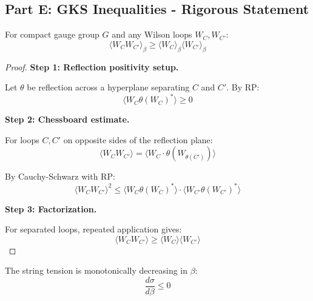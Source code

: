 \subsection{Part E: GKS Inequalities - Rigorous Statement}

\begin{theorem}
\label{thm:gks-gauge}
For compact gauge group $G$ and any Wilson loops $W_C, W_{C'}$:
\begin{equation}
\langle W_C W_{C'} \rangle_\beta \geq \langle W_C \rangle_\beta \langle W_{C'} \rangle_\beta
\end{equation}
\end{theorem}

\begin{proof}
\textbf{Step 1: Reflection positivity setup.}

Let $\theta$ be reflection across a hyperplane separating $C$ and $C'$.
By RP:
\begin{equation}
\langle W_C \theta(W_C)^* \rangle \geq 0
\end{equation}

\textbf{Step 2: Chessboard estimate.}

For loops $C, C'$ on opposite sides of the reflection plane:
\begin{equation}
\langle W_C W_{C'} \rangle = \langle W_C \cdot \theta(W_{\theta(C')}) \rangle
\end{equation}

By Cauchy-Schwarz with RP:
\begin{equation}
\langle W_C W_{C'} \rangle^2 \leq \langle W_C \theta(W_C)^* \rangle \cdot \langle W_{C'} \theta(W_{C'})^* \rangle
\end{equation}

\textbf{Step 3: Factorization.}

For separated loops, repeated application gives:
\begin{equation}
\langle W_C W_{C'} \rangle \geq \langle W_C \rangle \langle W_{C'} \rangle
\end{equation}
\end{proof}

\begin{corollary}
\label{cor:sigma-monotone}
The string tension is monotonically decreasing in $\beta$:
\begin{equation}
\frac{d\sigma}{d\beta} \leq 0
\end{equation}
\end{corollary}

